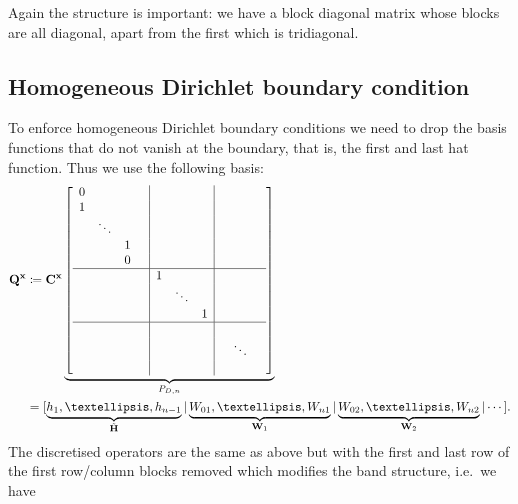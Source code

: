 \documentclass[hidelinks,onefignum,onetabnum]{siamart220329}
\def\bfC{{\bf C}}
\def\bfW{{\bf W}}
\def\bfx{{\bf x}}
\def\bfH{{\bf H}}
\def\bfQ{{\bf Q}}
\def\bfHt{\tilde\bfH}
\begin{document}
Again the structure is important: we have a block diagonal matrix whose blocks are all diagonal, apart from the first which is tridiagonal. 


\subsection{Homogeneous Dirichlet boundary condition}




To enforce homogeneous Dirichlet boundary conditions we need to  drop the basis functions that do not vanish at the boundary, that is, the first and last hat function. Thus we use the following basis:
\begin{align*}
{\bfQ}^\bfx &\coloneqq \bfC^\bfx  \underbrace{\left[\begin{array}{c c c c | c c c | c c c }
0 & &    &        &  &   &         \\
1 &  &  &         &  & &        \\
  & \ddots  &  &       &   & &       \\
  &    & 1 &       &   &    &        \\
  &&0 &		&&&\\
  \hline
   &  &  &       & 1 &   &     \\
   &  & &        &   & \ddots &    \\
    &  & &       &   &   & 1  \\
	 \hline
	  &  &    &  &&&     &  &   &    \\
	 &  &  &     &&&   &   & \ddots &    \\
	  &   &  &   &&&    &   &   &  
\end{array}\right]}
_{P_{D,n}} \\
&= [\underbrace{h_1,\ldots,h_{n-1}}_{\bfHt} | \underbrace{W_{01}, \ldots,W_{n1}}_{\bfW_1} | \underbrace{W_{02}, \ldots,W_{n2}}_{\bfW_2} | \cdots].
\end{align*}
The discretised operators are the same as above but with the first and last row of the first row/column blocks removed which modifies the band structure, i.e.~we have
\end{document}
